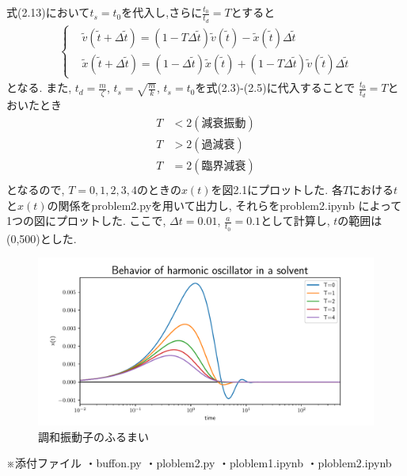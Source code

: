\documentclass[a4paper,dvipdfmx]{jarticle}
\begin{document}
\subsection{}
\noindent

式(2.13)において$t_s=t_0$を代入し,さらに$\frac{t_0}{t_d}=T$とすると
\begin{subequations}
    \begin{align}
    \left\{
        \begin{aligned}
        & \tilde{v}(\tilde{t} + \Delta \tilde{t}) = \left(1 - T \Delta \tilde{t} \right) \tilde{v}(\tilde{t})
        - \tilde{x}(\tilde{t}) \Delta \tilde{t}\\
        & \tilde{x}(\tilde{t} + \Delta \tilde{t}) = (1 - \Delta \tilde{t} ) \tilde{x}(\tilde{t}) 
        + \left(1 - T \Delta \tilde{t} \right) \tilde{v}(\tilde{t}) \Delta \tilde{t}
        \end{aligned}
    \right. \tag{2.14}
    \end{align}
\end{subequations}
となる.
また, $t_d = \frac{m}{\zeta}$, $t_s = \sqrt{\frac{m}{k}}$, $t_s=t_0$を式(2.3)-(2.5)に代入することで
$\frac{t_0}{t_d}=T$とおいたとき
\begin{align*}
    T & < 2　　 (減衰振動) \tag{2.3}\\
    T & > 2　　 (過減衰) \tag{2.4}\\
    T & = 2　　 (臨界減衰) \tag{2.5}\\
\end{align*}
となるので, $T=0, 1, 2, 3, 4$のときの$x(t)$を図2.1にプロットした.
各$T$における$t$と$x(t)$の関係をproblem2.pyを用いて出力し, それらをproblem2.ipynb
によって1つの図にプロットした. 
ここで, $\Delta t=0.01$, $\frac{a}{t_0}=0.1$として計算し, $t$の範囲は(0,500)とした. 

\begin{figure}[H]
    \centering
    \includegraphics[scale=0.6]{./problem_2/problem2.pdf}
    \caption{調和振動子のふるまい}
\end{figure}

\newpage
※添付ファイル
・buffon.py
・ploblem2.py
・ploblem1.ipynb
・ploblem2.ipynb
\end{document}

